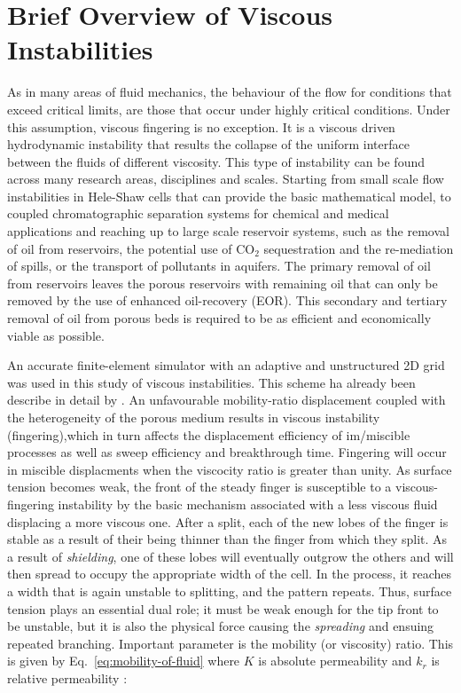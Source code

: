 \documentclass[preprint,authoryear,12pt]{elsarticle}
\begin{document}
\section{Brief Overview of Viscous Instabilities}\label{section:ViscousInstabilities}
\medskip
As in many areas of fluid mechanics, the behaviour of the flow for conditions that exceed critical limits, are those that occur under highly critical conditions. Under this assumption, viscous fingering is no exception. It is a viscous driven hydrodynamic instability that results the collapse of the uniform interface between the fluids of different viscosity. This type of instability can be found across many research areas, disciplines and scales. Starting from small scale flow instabilities in Hele-Shaw cells that can provide the basic mathematical model, to coupled chromatographic separation systems for chemical and medical applications and reaching up to large scale reservoir systems,  such as the removal of oil from reservoirs, the potential use of CO$_2$ sequestration and the re-mediation of spills, or the transport of pollutants in aquifers. The primary removal of oil from reservoirs leaves the porous reservoirs with remaining oil that can only be removed by the use of enhanced oil-recovery (EOR). This secondary and tertiary removal of oil from porous beds is required to be as efficient and economically viable as possible.

An accurate finite-element simulator with an adaptive and unstructured 2D grid was used in this study of viscous instabilities. This scheme ha already been describe in detail by \citet{pavlidis2016}. An unfavourable mobility-ratio displacement coupled with the heterogeneity of the porous medium results in viscous instability (fingering),which in turn affects the displacement efficiency of im/miscible processes as well as sweep efficiency and breakthrough time. 
Fingering will occur in miscible displacments when the viscocity ratio is greater than unity. As surface tension becomes weak, the front of the steady finger is susceptible to a viscous-fingering instability by the basic mechanism associated with a less viscous fluid displacing a more viscous one. After a split, each of the new lobes of the finger is stable as a result of their being thinner than the finger from which they split. As a result of \textit{shielding}, one of these lobes will eventually outgrow the others and will then spread to occupy the appropriate width of the cell. In the process, it reaches a width that is again unstable to splitting, and the pattern repeats. Thus, surface tension plays an essential dual role; it must be weak enough for the tip front to be unstable, but it is also the physical force causing the \textit{spreading} and ensuing repeated branching. Important parameter is the mobility (or viscosity) ratio. This is given by Eq.~\ref{eq:mobility-of-fluid} where $K$ is absolute permeability and $k_{r}$ is relative permeability :
\end{document}
